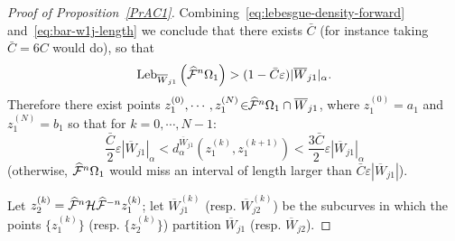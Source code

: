 \documentclass[10pt]{amsart}
\theoremstyle{definition}\newtheorem{defi}[theo]{Definition}\newtheorem{rema}[theo]{Remark}\newtheorem{exam}[theo]{Example}\newtheorem{exem}[theo]{Example}\newtheorem{nota}[theo]{Notation}
\newcommand{\eps}{\varepsilon}
\newcommand{\cm}{\mathcal{F}}
\newcommand{\hol}{\mathcal{H}}
\newcommand{\cmp}{\hat\cm}
\newcommand{\brW}{\overline{W}}
\newcommand{\dadm}[1]{\dadmPrivate^{#1}}
\newcommand{\dadmPrivate}{d\adm}
\newcommand{\adm}{_{\alpha^{+}}}
\newcommand{\Leb}{\textup{Leb}}
\renewcommand{\adm}{_{\alpha}}
\renewcommand{\dadm}{d\adm}
\let\oldhat\hat
\renewcommand*{\hat}[1]{\mathchoice{\widehat{#1}}{\widehat{#1}}{\oldhat{#1}}{\oldhat{#1}}}
\begin{document}
\begin{proof}[Proof of Proposition~\ref{PrAC1}]
Combining~\eqref{eq:lebesgue-density-forward} and~\eqref{eq:bar-w1j-length} we conclude that there exists $\bar C$ (for instance taking $\bar C = 6C$ would do), so that
\begin{align*}
\Leb_{\brW_{j1}}\left(\cmp^{n}\Omega_{1}\right) > (1-\bar C\eps)|\brW_{j1}|\adm.
\end{align*}
Therefore there exist points $z_{1}^{(0)},\cdots,z_{1}^{(N)}\!\in\!\!\cmp^{n}\Omega_{1}\cap\brW_{j1}$, where $z_{1}^{(0)} = a_{1}$ and $z_{1}^{(N)} = b_{1}$ so that for $k = 0,\cdots, N-1$:
\begin{equation}\label{Dist1}
\frac{\bar C}{2}\eps|\brW_{j1}|\adm < \dadm^{\brW_{j1}}\left(z_1^{(k)},z_1^{(k+1)}\right) <
\frac{3 \bar C}{2}\eps|\brW_{j1}|\adm
\end{equation}
(otherwise, $\cmp^{n}\Omega_{1}$ would miss an interval of length larger than $\bar C\eps|\brW_{j1}|$).

Let $z_{2}^{(k)} = \cmp^{n}\hol\cmp^{-n}z_{1}^{(k)}$; let $\brW_{j1}^{(k)}$ (resp. $\brW_{j2}^{(k)}$) be the subcurves in which the points $\{z_{1}^{(k)}\}$ (resp. $\{z_{2}^{(k)}\}$) partition $\brW_{j1}$ (resp. $\brW_{j2}$).


\end{proof}
\end{document}
